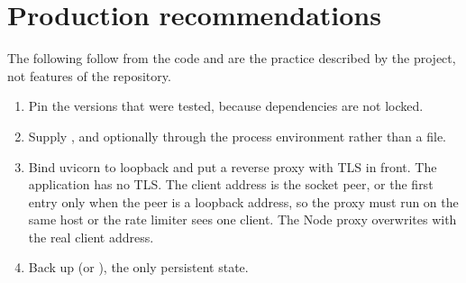 \section{Production recommendations}
The following follow from the code and are the practice described by the project, not features of the repository.
\begin{enumerate}
  \item Pin the versions that were tested, because dependencies are not locked.
  \item Supply ,  and optionally  through the process environment rather than a file.
  \item Bind uvicorn to loopback and put a reverse proxy with TLS in front. The application has no TLS. The client address is the socket peer, or the first  entry only when the peer is a loopback address, so the proxy must run on the same host or the rate limiter sees one client. The Node proxy overwrites  with the real client address.
  \item Back up  (or ), the only persistent state.
\end{enumerate}

